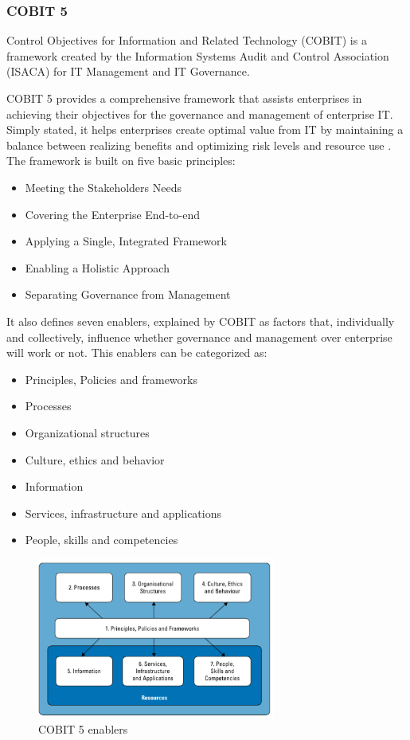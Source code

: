 \subsubsection{COBIT 5}

Control Objectives for Information and Related Technology (COBIT) is a framework created by the Information Systems Audit and Control Association (ISACA) for IT Management and IT Governance.\par
COBIT 5 provides a comprehensive framework that assists enterprises in achieving their objectives for the governance and management of enterprise IT. Simply stated, it helps enterprises create optimal value from IT by maintaining a balance between realizing benefits and optimizing risk levels and resource use \cite{2012cobit}. The framework is built on five basic principles:

\begin{itemize}
  \item Meeting the Stakeholders Needs 
  \item Covering the Enterprise End-to-end
  \item Applying a Single, Integrated Framework
  \item Enabling a Holistic Approach
  \item Separating Governance from Management
\end{itemize}


It also defines seven enablers, explained by COBIT as factors that, individually and collectively, influence whether governance and management over enterprise will work or not. This enablers can be categorized as:

\begin{itemize}
  \item Principles, Policies and frameworks 
  \item Processes 
  \item Organizational structures
  \item Culture, ethics and behavior 
  \item Information
  \item Services, infrastructure and applications
  \item People, skills and competencies
\end{itemize}

\begin{figure}
\centering
\includegraphics[width=0.7\textwidth]{img/Enablers.png}
\caption{COBIT 5 enablers}
\end{figure}


